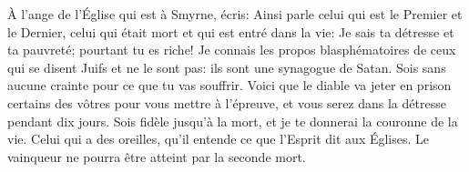 À l’ange de l’Église qui est à Smyrne, écris:
	Ainsi parle celui qui est le Premier et le Dernier,
	celui qui était mort et qui est entré dans la vie:
	Je sais ta détresse et ta pauvreté; pourtant tu es riche!
Je connais les propos blasphématoires
	de ceux qui se disent Juifs et ne le sont pas:
	ils sont une synagogue de Satan.
Sois sans aucune crainte pour ce que tu vas souffrir.
Voici que le diable va jeter en prison certains des vôtres
	pour vous mettre à l’épreuve,
	et vous serez dans la détresse pendant dix jours.
Sois fidèle jusqu’à la mort,
	et je te donnerai la couronne de la vie.
Celui qui a des oreilles, qu’il entende ce que l’Esprit dit aux Églises.
	Le vainqueur ne pourra être atteint par la seconde mort.
